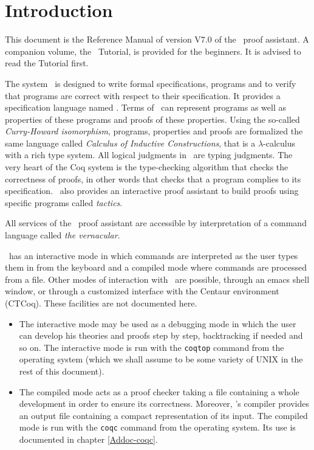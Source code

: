 \chapter*{Introduction}

This document is the Reference Manual of version V7.0 of the \Coq\ 
proof assistant. A companion volume, the \Coq\ Tutorial, is provided
for the beginners. It is advised to read the Tutorial first.

The system \Coq\ is designed to write formal specifications,
programs and to verify that programs are correct with respect to their
specification. It provides a specification language named \gallina. Terms of
\gallina\ can represent programs as well as properties of these
programs and proofs of these properties. Using the so-called
\textit{Curry-Howard isomorphism}, programs, properties and proofs are
formalized the same 
language called \textit{Calculus of Inductive Constructions}, that is
a $\lambda$-calculus with a rich type system.
All logical judgments in \Coq\ are typing judgments. The very heart of the Coq
system is the type-checking algorithm that checks the correctness of
proofs, in other words that checks that a program complies to its
specification. \Coq\ also provides an interactive proof assistant to
build proofs using specific programs called \textit{tactics}.

All services of the \Coq\ proof assistant are accessible by
interpretation of a command language called \textit{the vernacular}.

\Coq\ has an interactive mode in which commands are interpreted as the
user types them in from the keyboard and a compiled mode where
commands are processed from a file.  Other modes of interaction with
\Coq\ are possible, through an emacs shell window, or through a
customized interface with the Centaur environment (CTCoq). These
facilities are not documented here.

\begin{itemize}
\item The interactive mode may be used as a debugging mode in which
  the user can develop his theories and proofs step by step,
  backtracking if needed and so on. The interactive mode is run with
  the {\tt coqtop} command from the operating system (which we shall
  assume to be some variety of UNIX in the rest of this document).
\item The compiled mode acts as a proof checker taking a file
  containing a whole development in order to ensure its correctness.
  Moreover, \Coq's compiler provides an output file containing a
  compact representation of its input. The compiled mode is run with
  the {\tt coqc} command from the operating system. Its use is
  documented in chapter \ref{Addoc-coqc}.
\end{itemize}

